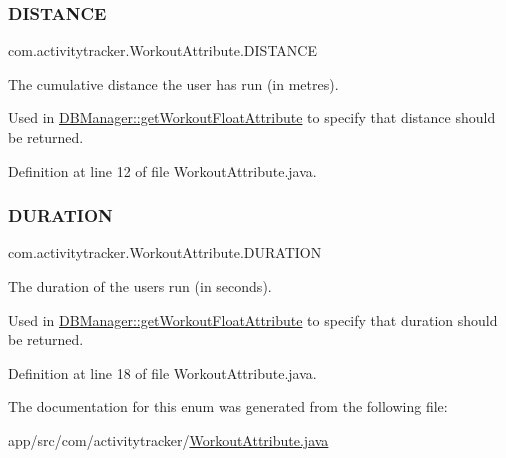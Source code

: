 \subsubsection{\texorpdfstring{D\+I\+S\+T\+A\+N\+CE}{DISTANCE}}
{\footnotesize\ttfamily com.\+activitytracker.\+Workout\+Attribute.\+D\+I\+S\+T\+A\+N\+CE}

The cumulative distance the user has run (in metres).

Used in \mbox{\hyperlink{classcom_1_1activitytracker_1_1_d_b_manager_a6bda377e79678d0e898c4240d24eb391}{D\+B\+Manager\+::get\+Workout\+Float\+Attribute}} to specify that distance should be returned. 

Definition at line 12 of file Workout\+Attribute.\+java.

\mbox{\label{enumcom_1_1activitytracker_1_1_workout_attribute_a26bf4a418622c817101083d0152b1cce}} 
\subsubsection{\texorpdfstring{D\+U\+R\+A\+T\+I\+ON}{DURATION}}
{\footnotesize\ttfamily com.\+activitytracker.\+Workout\+Attribute.\+D\+U\+R\+A\+T\+I\+ON}

The duration of the user\textquotesingle{}s run (in seconds).

Used in \mbox{\hyperlink{classcom_1_1activitytracker_1_1_d_b_manager_a6bda377e79678d0e898c4240d24eb391}{D\+B\+Manager\+::get\+Workout\+Float\+Attribute}} to specify that duration should be returned. 

Definition at line 18 of file Workout\+Attribute.\+java.



The documentation for this enum was generated from the following file\+:\begin{DoxyCompactItemize}
\item 
app/src/com/activitytracker/\mbox{\hyperlink{_workout_attribute_8java}{Workout\+Attribute.\+java}}\end{DoxyCompactItemize}
